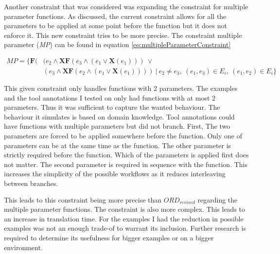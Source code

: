 \documentclass{article}
\begin{document}
Another constraint that was considered was expanding the constraint for multiple parameter functions. As discussed, the current constraint allows for all the parameters to be applied at some point before the function but it does not enforce it. This new constraint tries to be more precise. 
The constraint multiple parameter (\textit{MP}) can be found in equation \ref{eq:multipleParameterConstraint}

\begin{align}
     MP=\{\textbf{F}(& (e_2 \wedge \textbf{XF}(e_3 \wedge (e_1 \vee \textbf{X}(e_1)))\    \vee \nonumber \\
     &(e_3 \wedge \textbf{XF}(e_2 \wedge (e_1 \vee \textbf{X}(e_1)))  ) \ |\ e_2 \not= e_3,\ (e_1,e_3) \in  E_i ,\ (e_1,e_2) \in  E_i\}  \label{eq:multipleParameterConstraint}
\end{align}

This given constraint only handles functions with 2 parameters. The examples and the tool annotations I tested on only had functions with at most 2 parameters. Thus it was sufficient to capture the wanted behaviour. 
The behaviour it simulates is based on domain knowledge. Tool annotations could have functions with multiple parameters but did not branch. First, The two parameters are forced to be applied somewhere before the function. Only one of parameters can be at the same time as the function. The other parameter is strictly required before the function. Which of the parameters is applied first does not matter. The second parameter is required in sequence with the function. This increases the simplicity of the possible workflows as it reduces interleaving between branches. 

This leads to this constraint being more precise than $ORD_{revised}$ regarding the multiple parameter functions. The constraint is also more complex. This leads to an increase in translation time. For the examples I had the reduction in possible examples was not an enough trade-of to warrant its inclusion. Further research is required to determine its usefulness for bigger examples or on a bigger environment. \\



\end{document}
